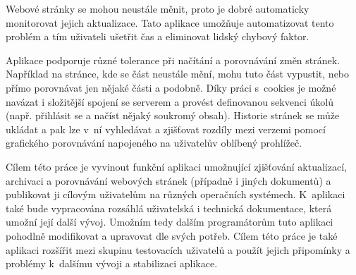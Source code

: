 
Webové stránky se mohou neustále měnit, proto je dobré automaticky monitorovat jejich aktualizace.
Tato aplikace umožňuje automatizovat tento problém a tím uživateli ušetřit čas a eliminovat lidský chybový faktor.

Aplikace podporuje různé tolerance při načítání a porovnávání změn stránek.
Například na stránce, kde se část neustále mění, mohu tuto část vypustit, nebo přímo porovnávat jen nějaké části a podobně. Díky práci s~cookies je možné navázat i složitější spojení se serverem a provést definovanou sekvenci úkolů (např. přihlásit se a načíst nějaký soukromý obsah). Historie stránek se může ukládat a pak lze v~ní vyhledávat a zjišťovat rozdíly mezi verzemi pomocí grafického porovnávání napojeného na uživatelův oblíbený prohlížeč.


Cílem této práce je vyvinout funkční aplikaci umožnující zjišťování aktualizací, archivaci a porovnávání webových stránek (případně i jiných dokumentů) a publikovat ji cílovým uživatelům na různých operačních systémech.
K~aplikaci také bude vypracována rozsáhlá uživatelská i technická dokumentace, která umožní její další vývoj.
Umožním tedy dalším programátorům tuto aplikaci pohodlně modifikovat a upravovat dle svých potřeb.
Cílem této práce je také aplikaci rozšířit mezi skupinu testovacích uživatelů a použít jejich připomínky a problémy k~dalšímu vývoji a stabilizaci aplikace.
